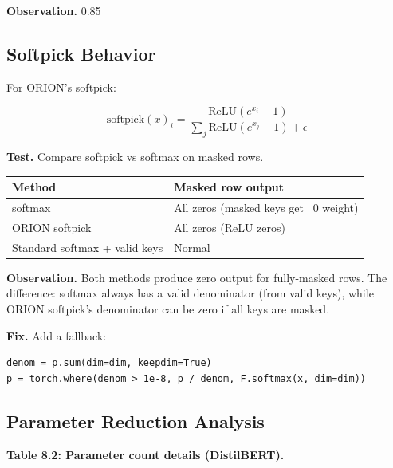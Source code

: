 \textbf{Observation.} 0.85

\subsection{Softpick Behavior}

For ORION's softpick:

\[
\text{softpick}(x)_i = \frac{\text{ReLU}(e^{x_i} - 1)}{\sum_j \text{ReLU}(e^{x_j} - 1) + \epsilon}
\]

\textbf{Test.} Compare softpick vs softmax on masked rows.

\begin{table}[H]
\centering
\small
\begin{tabular}{ll}
\toprule
\textbf{Method} & \textbf{Masked row output} \\
\midrule
softmax & All zeros (masked keys get ~0 weight) \\
ORION softpick & All zeros (ReLU zeros) \\
Standard softmax + valid keys & Normal \\
\bottomrule
\end{tabular}
\end{table}

\textbf{Observation.} Both methods produce zero output for fully-masked rows. 
The difference: softmax always has a valid denominator (from valid keys), 
while ORION softpick's denominator can be zero if all keys are masked.

\textbf{Fix.} Add a fallback:

\begin{lstlisting}
denom = p.sum(dim=dim, keepdim=True)
p = torch.where(denom > 1e-8, p / denom, F.softmax(x, dim=dim))
\end{lstlisting}

\subsection{Parameter Reduction Analysis}

\textbf{Table 8.2: Parameter count details (DistilBERT).}

\begin{table}[H]
\centering
\small
{}
\end{table}

